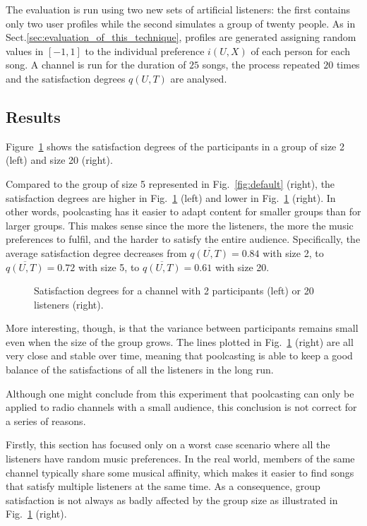 The evaluation is run using two new sets of artificial listeners: the first contains only two user profiles while the second simulates a group of twenty people. 
As in Sect.\ref{sec:evaluation_of_this_technique}, profiles are generated assigning random values in $[-1,1]$ to the individual preference $i(U,X)$ of each person for each song.
A channel is run for the duration of $25$ songs, the process repeated $20$ times and the satisfaction degrees $q(U,T)$ are analysed.

\subsection{Results} %
\label{sub:results345}

Figure~\ref{fig:size} shows the satisfaction degrees of the participants in a group of size 2 (left) and size 20 (right). 

Compared to the group of size 5 represented in Fig.~\ref{fig:default} (right), the satisfaction degrees are higher in Fig.~\ref{fig:size} (left) and lower in Fig.~\ref{fig:size} (right).
In other words, poolcasting has it easier to adapt content for smaller groups than for larger groups. This makes sense since the more the listeners, the more the music preferences to fulfil, and the harder to satisfy the entire audience.
Specifically, the average satisfaction degree decreases from
$\overline{q(U,T)} = 0.84$ with size 2, to $\overline{q(U,T)} = 0.72$ with size 5, to $\overline{q(U,T)} = 0.61$ with size 20.
%
\begin{figure}[bthp]
\centering \setlength{\abovecaptionskip}{3pt}
\caption{Satisfaction degrees for a channel with 2 participants (left) or 20 listeners (right).}
\label{fig:size}
\end{figure}

More interesting, though, is that the variance between participants remains small even when the size of the group grows.
The lines plotted in Fig.~\ref{fig:size} (right) are all very close and stable over time, meaning that poolcasting is able to keep a good balance of the satisfactions of all the listeners in the long run.

Although one might conclude from this experiment that poolcasting can only be applied to radio channels with a small audience, this conclusion is not correct for a series of reasons.

Firstly, this section has focused only on a worst case scenario where all the listeners have random music preferences. 
In the real world, members of the same channel typically share some musical affinity, which makes it easier to find songs that satisfy multiple listeners at the same time.
As a consequence, group satisfaction is not always as badly affected by the group size as illustrated in Fig.~\ref{fig:size} (right).


